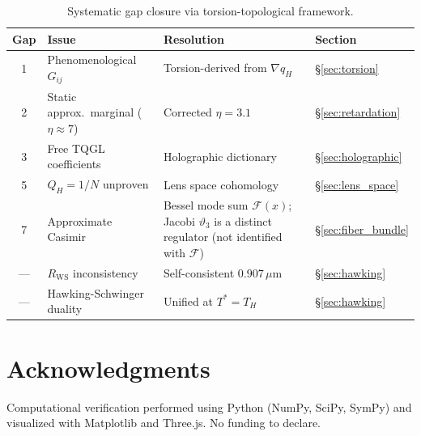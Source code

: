 \documentclass[11pt,letterpaper]{article}
\begin{document}
\begin{table}[H]
\centering
\caption{Systematic gap closure via torsion-topological framework.}
\begin{tabular}{clll}
\toprule
\textbf{Gap} & \textbf{Issue} & \textbf{Resolution} & \textbf{Section} \\
\midrule
1 & Phenomenological $G_{ij}$ & Torsion-derived from $\nabla q_H$ & \S\ref{sec:torsion} \\
2 & Static approx.\ marginal ($\eta\approx 7$) & Corrected $\eta = 3.1$ & \S\ref{sec:retardation} \\
3 & Free TQGL coefficients & Holographic dictionary & \S\ref{sec:holographic} \\
5 & $Q_H = 1/N$ unproven & Lens space cohomology & \S\ref{sec:lens_space} \\
7 & Approximate Casimir & Bessel mode sum $\mathcal{F}(x)$; Jacobi $\vartheta_3$ is a distinct regulator (not identified with $\mathcal{F}$) & \S\ref{sec:fiber_bundle} \\
--- & $R_{\text{WS}}$ inconsistency & Self-consistent $0.907\,\mu$m & \S\ref{sec:hawking} \\
--- & Hawking-Schwinger duality & Unified at $T^* = T_H$ & \S\ref{sec:hawking} \\
\bottomrule
\end{tabular}
\label{tab:gaps}
\end{table}

\section*{Acknowledgments}

Computational verification performed using Python (NumPy, SciPy, SymPy) and visualized with Matplotlib and Three.js. No funding to declare.
\end{document}
